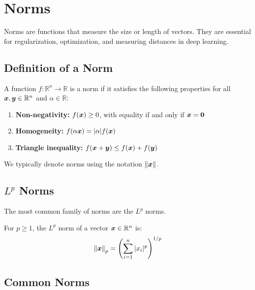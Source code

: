 
\section{Norms}
\label{sec:norms}

Norms are functions that measure the size or length of vectors. They are essential for regularization, optimization, and measuring distances in deep learning.

\subsection{Definition of a Norm}

\begin{definition}[Norm]
A function $f: \mathbb{R}^n \rightarrow \mathbb{R}$ is a norm if it satisfies the following properties for all $\boldsymbol{x}, \boldsymbol{y} \in \mathbb{R}^n$ and $\alpha \in \mathbb{R}$:
\begin{enumerate}
    \item \textbf{Non-negativity:} $f(\boldsymbol{x}) \geq 0$, with equality if and only if $\boldsymbol{x} = \boldsymbol{0}$
    \item \textbf{Homogeneity:} $f(\alpha\boldsymbol{x}) = |\alpha|f(\boldsymbol{x})$
    \item \textbf{Triangle inequality:} $f(\boldsymbol{x} + \boldsymbol{y}) \leq f(\boldsymbol{x}) + f(\boldsymbol{y})$
\end{enumerate}
\end{definition}

We typically denote norms using the notation $\left\lVert\boldsymbol{x}\right\rVert$.

\subsection{$L^p$ Norms}

The most common family of norms are the $L^p$ norms.

\begin{definition}[$L^p$ Norm]
For $p \geq 1$, the $L^p$ norm of a vector $\boldsymbol{x} \in \mathbb{R}^n$ is:
\begin{equation}
    \left\lVert\boldsymbol{x}\right\rVert_p = \left(\sum_{i=1}^{n} |x_i|^p\right)^{1/p}
\end{equation}
\end{definition}

\subsection{Common Norms}

